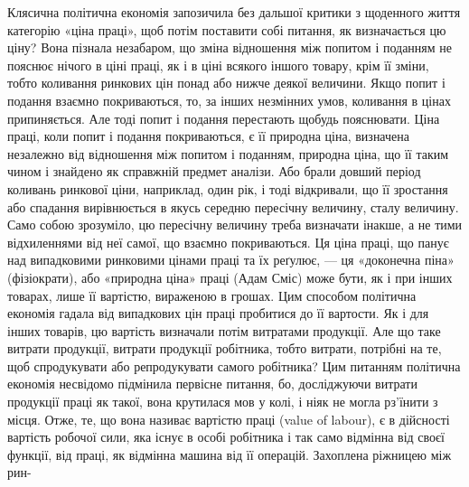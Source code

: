 Клясична політична економія запозичила без дальшої критики
з щоденного життя категорію «ціна праці», щоб потім поставити
собі питання, як визначається цю ціну? Вона пізнала
незабаром, що зміна відношення між попитом і поданням не
пояснює нічого в ціні праці, як і в ціні всякого іншого товару,
крім її зміни, тобто коливання ринкових цін понад або нижче
деякої величини. Якщо попит і подання взаємно покриваються,
то, за інших незмінних умов, коливання в цінах припиняється.
Але тоді попит і подання перестають щобудь пояснювати. Ціна
праці, коли попит і подання покриваються, є її природна ціна,
визначена незалежно від відношення між попитом і поданням,
природна ціна, що її таким чином і знайдено як справжній предмет
аналізи. Або брали довший період коливань ринкової ціни,
наприклад, один рік, і тоді відкривали, що її зростання або
спадання вирівнюється в якусь середню пересічну величину,
сталу величину. Само собою зрозуміло, цю пересічну величину
треба визначати інакше, а не тими відхиленнями від неї самої,
що взаємно покриваються. Ця ціна праці, що панує над випадковими
ринковими цінами праці та їх реґулює, — ця «доконечна
піна» (фізіократи), або «природна ціна» праці (Адам Сміс) може
бути, як і при інших товарах, лише її вартістю, вираженою в
грошах. Цим способом політична економія гадала від випадкових
цін праці пробитися до її вартости. Як і для інших товарів,
цю вартість визначали потім витратами продукції. Але що таке
витрати продукції, витрати продукції робітника, тобто витрати,
потрібні на те, щоб спродукувати або репродукувати самого
робітника? Цим питанням політична економія несвідомо підмінила
первісне питання, бо, досліджуючи витрати продукції
праці як такої, вона крутилася мов у колі, і ніяк не могла рз’їнити
з місця. Отже, те, що вона називає вартістю праці (value of labour),
є в дійсності вартість робочої сили, яка існує в особі
робітника і так само відмінна від своєї функції, від праці, як
відмінна машина від її операцій. Захоплена ріжницею між рин-
\parbreak{}  %
